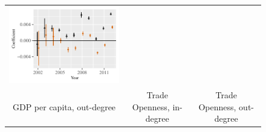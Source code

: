 \documentclass[reqno,onecolumn,letterpaper,12pt]{article}
\begin{document}
\begin{figure}[htp]
\begin{tabular}{@{\hskip -.05cm}c@{\hskip -.2cm}c@{\hskip -.2cm}c}
\includegraphics[height=.165\textheight, clip=true, trim=.5cm .5cm 0cm .1cm]{figures/main_rl_plots/Dest_GDPpc.pdf} \\

GDP per capita,  out-degree &
Trade Openness, in-degree&
Trade Openness,  out-degree \\


\end{tabular}
\end{figure}
\end{document}
